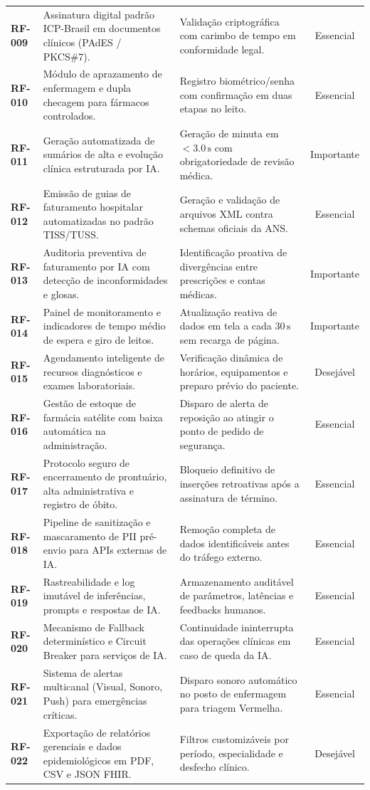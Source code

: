 \documentclass[12pt,oneside,a4paper,article]{abntex2}
\begin{document}
\begin{table}[htb]
\begin{tabularx}{\textwidth}{l p{5.2cm} p{6.5cm} c}
\textbf{RF-009} & Assinatura digital padrão ICP-Brasil em documentos clínicos (PAdES / PKCS\#7). & Validação criptográfica com carimbo de tempo em conformidade legal. & Essencial \\
\textbf{RF-010} & Módulo de aprazamento de enfermagem e dupla checagem para fármacos controlados. & Registro biométrico/senha com confirmação em duas etapas no leito. & Essencial \\
\textbf{RF-011} & Geração automatizada de sumários de alta e evolução clínica estruturada por IA. & Geração de minuta em $< 3.0\,\text{s}$ com obrigatoriedade de revisão médica. & Importante \\
\textbf{RF-012} & Emissão de guias de faturamento hospitalar automatizadas no padrão TISS/TUSS. & Geração e validação de arquivos XML contra schemas oficiais da ANS. & Essencial \\
\textbf{RF-013} & Auditoria preventiva de faturamento por IA com detecção de inconformidades e glosas. & Identificação proativa de divergências entre prescrições e contas médicas. & Importante \\
\textbf{RF-014} & Painel de monitoramento e indicadores de tempo médio de espera e giro de leitos. & Atualização reativa de dados em tela a cada $30\,\text{s}$ sem recarga de página. & Importante \\
\textbf{RF-015} & Agendamento inteligente de recursos diagnósticos e exames laboratoriais. & Verificação dinâmica de horários, equipamentos e preparo prévio do paciente. & Desejável \\
\textbf{RF-016} & Gestão de estoque de farmácia satélite com baixa automática na administração. & Disparo de alerta de reposição ao atingir o ponto de pedido de segurança. & Essencial \\
\textbf{RF-017} & Protocolo seguro de encerramento de prontuário, alta administrativa e registro de óbito. & Bloqueio definitivo de inserções retroativas após a assinatura de término. & Essencial \\
\textbf{RF-018} & Pipeline de sanitização e mascaramento de PII pré-envio para APIs externas de IA. & Remoção completa de dados identificáveis antes do tráfego externo. & Essencial \\
\textbf{RF-019} & Rastreabilidade e log imutável de inferências, prompts e respostas de IA. & Armazenamento auditável de parâmetros, latências e feedbacks humanos. & Essencial \\
\textbf{RF-020} & Mecanismo de Fallback determinístico e Circuit Breaker para serviços de IA. & Continuidade ininterrupta das operações clínicas em caso de queda da IA. & Essencial \\
\textbf{RF-021} & Sistema de alertas multicanal (Visual, Sonoro, Push) para emergências críticas. & Disparo sonoro automático no posto de enfermagem para triagem Vermelha. & Essencial \\
\textbf{RF-022} & Exportação de relatórios gerenciais e dados epidemiológicos em PDF, CSV e JSON FHIR. & Filtros customizáveis por período, especialidade e desfecho clínico. & Desejável \\
\bottomrule
\end{tabularx}
\end{table}
\end{document}
